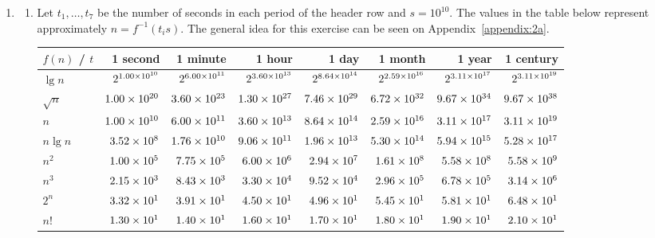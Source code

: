 \documentclass[12pt]{article}
\begin{document}
\begin{enumerate}
  \item 
  \begin{enumerate}
    \item\label{ex:2a} Let $t_{1}, \dots, t_{7}$ be the number of seconds in each period of the header row and $s = 10^{10}$. The values in the table below represent approximately $n = f^{-1}(t_{i} s)$. The general idea for this exercise can be seen on Appendix~\ref{appendix:2a}.
    \begin{table}[htbp]
      \renewcommand{\arraystretch}{1.2}
      \setlength{\tabcolsep}{7pt}
      \centering
      \footnotesize
      \begin{tabular}{l*{7}{r}}
        \toprule
        $f(n)$ / $t$ & 1 second & 1 minute & 1 hour & 1 day & 1 month & 1 year & 1 century \\ \midrule
        $   \lg n$ & $2^{\num{1.00E+10}}$ & $2^{\num{6.00E+11}}$ & $2^{\num{3.60E+13}}$ & $2^{\num{8.64E+14}}$ & $2^{\num{2.59E+16}}$ & $2^{\num{3.11E+17}}$ & $2^{\num{3.11E+19}}$ \\
        $\sqrt{n}$ & $\num{1.00E+20}$ & $\num{3.60E+23}$ & $\num{1.30E+27}$ & $\num{7.46E+29}$ & $\num{6.72E+32}$ & $\num{9.67E+34}$ & $\num{9.67E+38}$ \\
        $       n$ & $\num{1.00E+10}$ & $\num{6.00E+11}$ & $\num{3.60E+13}$ & $\num{8.64E+14}$ & $\num{2.59E+16}$ & $\num{3.11E+17}$ & $\num{3.11E+19}$ \\
        $ n \lg n$ & $\num{3.52E+08}$ & $\num{1.76E+10}$ & $\num{9.06E+11}$ & $\num{1.96E+13}$ & $\num{5.30E+14}$ & $\num{5.94E+15}$ & $\num{5.28E+17}$ \\
        $   n^{2}$ & $\num{1.00E+05}$ & $\num{7.75E+05}$ & $\num{6.00E+06}$ & $\num{2.94E+07}$ & $\num{1.61E+08}$ & $\num{5.58E+08}$ & $\num{5.58E+09}$ \\
        $   n^{3}$ & $\num{2.15E+03}$ & $\num{8.43E+03}$ & $\num{3.30E+04}$ & $\num{9.52E+04}$ & $\num{2.96E+05}$ & $\num{6.78E+05}$ & $\num{3.14E+06}$ \\
        $   2^{n}$ & $\num{3.32E+01}$ & $\num{3.91E+01}$ & $\num{4.50E+01}$ & $\num{4.96E+01}$ & $\num{5.45E+01}$ & $\num{5.81E+01}$ & $\num{6.48E+01}$ \\
        $      n!$ & $\num{1.30E+01}$ & $\num{1.40E+01}$ & $\num{1.60E+01}$ & $\num{1.70E+01}$ & $\num{1.80E+01}$ & $\num{1.90E+01}$ & $\num{2.10E+01}$ \\
        \bottomrule
      \end{tabular}
    \end{table}
    

\end{enumerate}
\end{enumerate}
\end{document}
